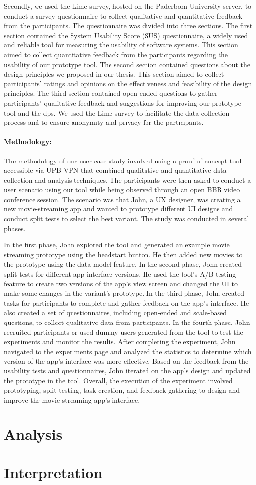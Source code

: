 Secondly, we used the Lime survey, hosted on the Paderborn University server, to conduct a survey questionnaire to collect qualitative and quantitative feedback from the participants. 
The questionnaire was divided into three sections. 
The first section contained the System Usability Score (SUS) questionnaire, a widely used and reliable tool for measuring the usability of software systems. 
This section aimed to collect quantitative feedback from the participants regarding the usability of our prototype tool. 
The second section contained questions about the design principles we proposed in our thesis. 
This section aimed to collect participants' ratings and opinions on the effectiveness and feasibility of the design principles. 
The third section contained open-ended questions to gather participants' qualitative feedback and suggestions for improving our prototype tool and the \ac{dp}s. 
We used the Lime survey to facilitate the data collection process and to ensure anonymity and privacy for the participants.

\paragraph{Methodology:}
The methodology of our user case study involved using a proof of concept tool accessible via UPB VPN that combined qualitative and quantitative data collection and analysis techniques. The participants were then asked to conduct a user scenario using our tool while being observed through an open BBB video conference session.
The scenario was that John, a UX designer, was creating a new movie-streaming app and wanted to prototype different UI designs and conduct split tests to select the best variant. 
The study was conducted in several phases.

In the first phase, John explored the tool and generated an example movie streaming prototype using the headstart button. He then added new movies to the prototype using the data model feature.
In the second phase, John created split tests for different app interface versions. 
He used the tool's A/B testing feature to create two versions of the app's view screen and changed the UI to make some changes in the variant's prototype.
In the third phase, John created tasks for participants to complete and gather feedback on the app's interface. 
He also created a set of questionnaires, including open-ended and scale-based questions, to collect qualitative data from participants.
In the fourth phase, John recruited participants or used dummy users generated from the tool to test the experiments and monitor the results. 
After completing the experiment, John navigated to the experiments page and analyzed the statistics to determine which version of the app's interface was more effective.
Based on the feedback from the usability tests and questionnaires, John iterated on the app's design and updated the prototype in the tool. 
Overall, the execution of the experiment involved prototyping, split testing, task creation, and feedback gathering to design and improve the movie-streaming app's interface.

\clearpage
\section{Analysis}
\label{evaluation:section:analysis}
\section{Interpretation}
\label{evaluation:section:interpretation}